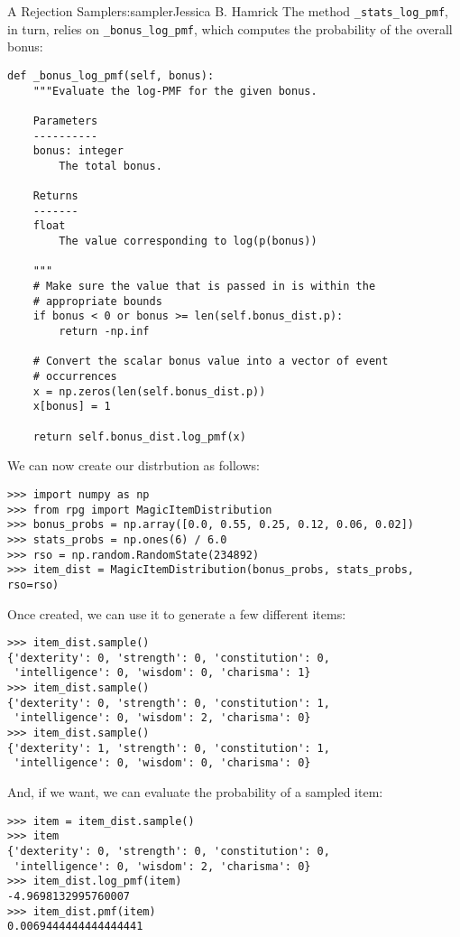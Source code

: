 \begin{aosachapter}{A Rejection Sampler}{s:sampler}{Jessica B. Hamrick}
The method \texttt{\_stats\_log\_pmf}, in turn, relies on
\texttt{\_bonus\_log\_pmf}, which computes the probability of the
overall bonus:

\begin{verbatim}
def _bonus_log_pmf(self, bonus):
    """Evaluate the log-PMF for the given bonus.

    Parameters
    ----------
    bonus: integer
        The total bonus.

    Returns
    -------
    float
        The value corresponding to log(p(bonus))

    """
    # Make sure the value that is passed in is within the
    # appropriate bounds
    if bonus < 0 or bonus >= len(self.bonus_dist.p):
        return -np.inf

    # Convert the scalar bonus value into a vector of event
    # occurrences
    x = np.zeros(len(self.bonus_dist.p))
    x[bonus] = 1

    return self.bonus_dist.log_pmf(x)
\end{verbatim}

We can now create our distrbution as follows:

\begin{verbatim}
>>> import numpy as np
>>> from rpg import MagicItemDistribution
>>> bonus_probs = np.array([0.0, 0.55, 0.25, 0.12, 0.06, 0.02])
>>> stats_probs = np.ones(6) / 6.0
>>> rso = np.random.RandomState(234892)
>>> item_dist = MagicItemDistribution(bonus_probs, stats_probs, rso=rso)
\end{verbatim}

Once created, we can use it to generate a few different items:

\begin{verbatim}
>>> item_dist.sample()
{'dexterity': 0, 'strength': 0, 'constitution': 0, 
 'intelligence': 0, 'wisdom': 0, 'charisma': 1}
>>> item_dist.sample()
{'dexterity': 0, 'strength': 0, 'constitution': 1, 
 'intelligence': 0, 'wisdom': 2, 'charisma': 0}
>>> item_dist.sample()
{'dexterity': 1, 'strength': 0, 'constitution': 1, 
 'intelligence': 0, 'wisdom': 0, 'charisma': 0}
\end{verbatim}

And, if we want, we can evaluate the probability of a sampled item:

\begin{verbatim}
>>> item = item_dist.sample()
>>> item
{'dexterity': 0, 'strength': 0, 'constitution': 0, 
 'intelligence': 0, 'wisdom': 2, 'charisma': 0}
>>> item_dist.log_pmf(item)
-4.9698132995760007
>>> item_dist.pmf(item)
0.0069444444444444441
\end{verbatim}


\end{aosachapter}
